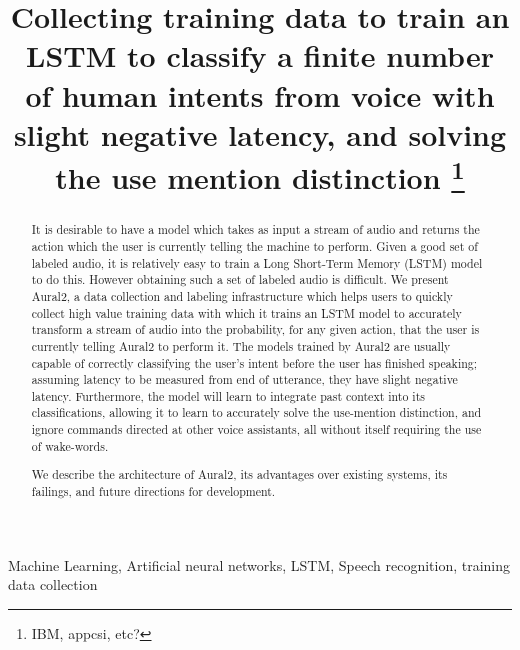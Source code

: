 \documentclass[conference]{IEEEtran}
\begin{document}
\title{Collecting training data to train an LSTM to classify a finite number of human intents from voice with slight negative latency, and solving the use mention distinction
\thanks{IBM, appcsi, etc?}
}

\author{
\and
{}
}

\maketitle

\begin{abstract}
It is desirable to have a model which takes as input a stream of audio and returns the action which the user is currently telling the machine to perform.
Given a good set of labeled audio, it is relatively easy to train a Long Short-Term Memory (LSTM) model to do this.
However obtaining such a set of labeled audio is difficult.
We present Aural2, a data collection and labeling infrastructure which helps users to quickly collect high value training data
with which it trains an LSTM model to accurately transform a stream of audio into the probability, for any given action,
that the user is currently telling Aural2 to perform it.
The models trained by Aural2 are usually capable of correctly classifying the user's intent before the user has finished speaking;
assuming latency to be measured from end of utterance, they have slight negative latency.
Furthermore, the model will learn to integrate past context into its classifications,
allowing it to learn to accurately solve the use-mention distinction,
and ignore commands directed at other voice assistants, all without itself requiring the use of wake-words.

We describe the architecture of Aural2, its advantages over existing
systems, its failings, and future directions for development.
\end{abstract}

\begin{IEEEkeywords}
Machine Learning, Artificial neural networks, LSTM, Speech recognition, training data collection
\end{IEEEkeywords}
\end{document}
